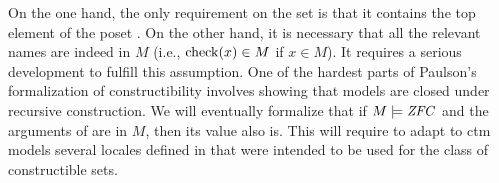 On the one hand, the only requirement on the set  is that it
contains the top element of the poset . On the other hand, it
is necessary that all the relevant names are indeed in $M$ (i.e.,
$\operatorname{check}(x) \in M$ if $x\in M$). It requires a serious development to
fulfill this assumption. One of the hardest parts of Paulson's
formalization of constructibility involves showing that models are
closed under recursive construction. We will eventually formalize that
if $M\models\mathit{ZFC}$ and the arguments of  are in $M$, then
its value also is. This will require to adapt to ctm models several
locales defined in \cite{paulson_2003} that were intended to be used
for the class of constructible sets.




